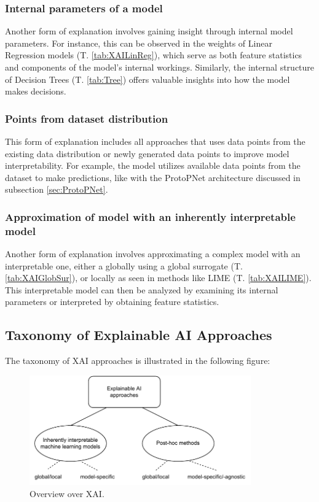 \subsubsection*{Internal parameters of a model}
Another form of explanation involves gaining insight through internal model parameters. For instance, this can be observed in the weights of Linear Regression models (T. \ref{tab:XAILinReg}), which serve as both feature statistics and components of the model's internal workings. Similarly, the internal structure of Decision Trees (T. \ref{tab:Tree}) offers valuable insights into how the model makes decisions.

\subsubsection*{Points from dataset distribution}
This form of explanation includes all approaches that uses data points from the existing data distribution or newly generated data points to improve model interpretability. For example, the model utilizes available data points from the dataset to make predictions, like with the ProtoPNet architecture discussed in subsection \ref{sec:ProtoPNet}.

\subsubsection*{Approximation of model with an inherently interpretable model}
Another form of explanation involves approximating a complex model with an interpretable one, either a globally using a global surrogate (T. \ref{tab:XAIGlobSur}), or locally as seen in methods like LIME (T. \ref{tab:XAILIME}). This interpretable model can then be analyzed by examining its internal parameters or interpreted by obtaining feature statistics.

\subsection{Taxonomy of Explainable AI Approaches}

The taxonomy of XAI approaches is illustrated in the following figure:
\begin{figure}[H]
    \centering
    \includegraphics[width=0.85\textwidth]{pics/XAI_Overview.pdf}
    \caption{Overview over XAI.}
    \label{fig:ov-xai}
\end{figure}

